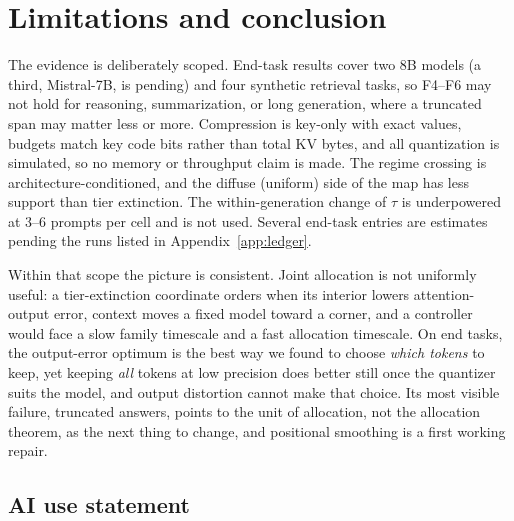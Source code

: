 \documentclass{article}
\theoremstyle{definition}
\begin{document}
\section{Limitations and conclusion}
\label{sec:conclusion}

The evidence is deliberately scoped.  End-task results cover two 8B models (a third, Mistral-7B, is pending) and four synthetic retrieval tasks, so F4--F6 may not hold for reasoning, summarization, or long generation, where a truncated span may matter less or more.  Compression is key-only with exact values, budgets match key code bits rather than total KV bytes, and all quantization is simulated, so no memory or throughput claim is made.  The regime crossing is architecture-conditioned, and the diffuse (uniform) side of the map has less support than tier extinction.  The within-generation change of $\tau$ is underpowered at 3--6 prompts per cell and is not used.  Several end-task entries are estimates pending the runs listed in Appendix~\ref{app:ledger}.

Within that scope the picture is consistent.  Joint allocation is not uniformly useful: a tier-extinction coordinate orders when its interior lowers attention-output error, context moves a fixed model toward a corner, and a controller would face a slow family timescale and a fast allocation timescale.  On end tasks, the output-error optimum is the best way we found to choose \emph{which tokens} to keep, yet keeping \emph{all} tokens at low precision does better still once the quantizer suits the model, and output distortion cannot make that choice.  Its most visible failure, truncated answers, points to the unit of allocation, not the allocation theorem, as the next thing to change, and positional smoothing is a first working repair.

\label{main:end}

\subsection*{AI use statement}
\end{document}
